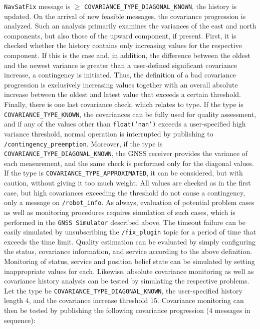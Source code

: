 \documentclass[english, master, utf8]{base/thesis_KBS}
\newcommand{\code}[1]{\colorbox{light-gray}{\texttt{#1}}}
\begin{document}
\code{NavSatFix} message is $\geq$ \code{COVARIANCE\_TYPE\_DIAGONAL\_KNOWN}, the history is updated. On the arrival of new feasible messages, the covariance progression is analyzed.
Such an analysis primarily examines the variances of the east and north components, but also those of the upward component, if present. First, it is checked whether the history
contains only increasing values for the respective component. If this is the case and, in addition, the difference between the oldest and the newest variance is greater than a
user-defined significant covariance increase, a contingency is initiated. Thus, the definition of a bad covariance progression is exclusively increasing values together with an
overall absolute increase between the oldest and latest value that exceeds a certain threshold. Finally, there is one last covariance check, which relates to type.
If the type is \code{COVARIANCE\_TYPE\_KNOWN}, the covariances can be fully used for quality assessment, and if any of the values other than \code{float(`nan')} exceeds a
user-specified high variance threshold, normal operation is interrupted by publishing to \code{/contingency\_preemption}. Moreover, if the type is 
\code{COVARIANCE\_TYPE\_DIAGONAL\_KNOWN}, the GNSS receiver provides the variance of each measurement, and the same check is performed only for the diagonal values.
If the type is \code{COVARIANCE\_TYPE\_APPROXIMATED}, it can be considered, but with caution, without giving it too much weight. All values are checked as in the first case,
but high covariances exceeding the threshold do not cause a contingency, only a message on \code{/robot\_info}.\newline
As always, evaluation of potential problem cases as well as monitoring procedures requires simulation of such cases, which is performed in the \code{GNSS Simulator} described above.
The timeout failure can be easily simulated by unsubscribing the \code{/fix\_plugin} topic for a period of time that exceeds the time limit. Quality estimation can be evaluated by
simply configuring the status, covariance information, and service according to the above definition. Monitoring of status, service and position belief state can be simulated by
setting inappropriate values for each. Likewise, absolute covariance monitoring as well as covariance history analysis can be tested by simulating the respective problems.
Let the type be \code{COVARIANCE\_TYPE\_DIAGONAL\_KNOWN}, the user-specified history length $4$, and the covariance increase threshold $15$. Covariance monitoring can then be tested
by publishing the following covariance progression ($4$ messages in sequence):
\end{document}
